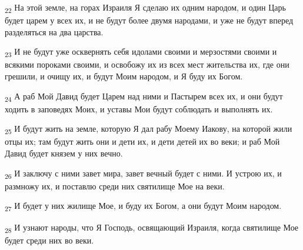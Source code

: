 \begin{tcolorbox}
\textsubscript{22} На этой земле, на горах Израиля Я сделаю их одним народом, и один Царь будет царем у всех их, и не будут более двумя народами, и уже не будут вперед разделяться на два царства.
\end{tcolorbox}
\begin{tcolorbox}
\textsubscript{23} И не будут уже осквернять себя идолами своими и мерзостями своими и всякими пороками своими, и освобожу их из всех мест жительства их, где они грешили, и очищу их, и будут Моим народом, и Я буду их Богом.
\end{tcolorbox}
\begin{tcolorbox}
\textsubscript{24} А раб Мой Давид будет Царем над ними и Пастырем всех их, и они будут ходить в заповедях Моих, и уставы Мои будут соблюдать и выполнять их.
\end{tcolorbox}
\begin{tcolorbox}
\textsubscript{25} И будут жить на земле, которую Я дал рабу Моему Иакову, на которой жили отцы их; там будут жить они и дети их, и дети детей их во веки; и раб Мой Давид будет князем у них вечно.
\end{tcolorbox}
\begin{tcolorbox}
\textsubscript{26} И заключу с ними завет мира, завет вечный будет с ними. И устрою их, и размножу их, и поставлю среди них святилище Мое на веки.
\end{tcolorbox}
\begin{tcolorbox}
\textsubscript{27} И будет у них жилище Мое, и буду их Богом, а они будут Моим народом.
\end{tcolorbox}
\begin{tcolorbox}
\textsubscript{28} И узнают народы, что Я Господь, освящающий Израиля, когда святилище Мое будет среди них во веки.
\end{tcolorbox}
